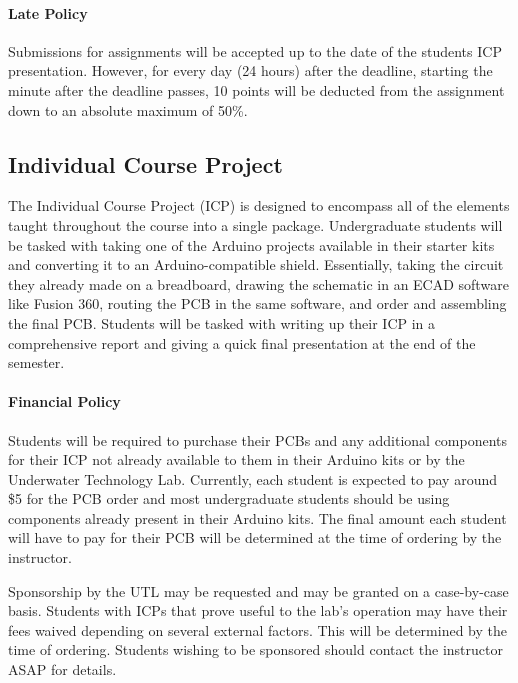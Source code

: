     \paragraph*{Late Policy} Submissions for assignments will be accepted up to the date of the students ICP presentation.
    However, for every day (24 hours) after the deadline, starting the minute after the deadline passes, 10 points will be deducted from the assignment down to an absolute maximum of 50\%.


    \subsection*{Individual Course Project}
    The Individual Course Project (ICP) is designed to encompass all of the elements taught throughout the course into a single package.
    Undergraduate students will be tasked with taking one of the Arduino projects available in their starter kits and converting it to an Arduino-compatible shield.
    Essentially, taking the circuit they already made on a breadboard, drawing the schematic in an ECAD software like Fusion 360, routing the PCB in the same software, and order and assembling the final PCB. 
    Students will be tasked with writing up their ICP in a comprehensive report and giving a quick final presentation at the end of the semester.

    \paragraph*{Financial Policy} Students will be required to purchase their PCBs and any additional components for their ICP not already available to them in their Arduino kits or by the Underwater Technology Lab. 
    Currently, each student is expected to pay around \$5 for the PCB order and most undergraduate students should be using components already present in their Arduino kits. 
    The final amount each student will have to pay for their PCB will be determined at the time of ordering by the instructor.
    
    Sponsorship by the UTL may be requested and may be granted on a case-by-case basis. Students with ICPs that prove useful to the lab's operation may have their fees waived depending on several external factors.
    This will be determined by the time of ordering.
    Students wishing to be sponsored should contact the instructor ASAP for details.

